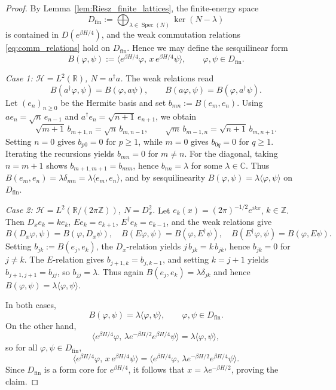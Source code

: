 \documentclass[11pt]{amsart}
\newcommand{\1}{\mathbbm{1}}
\theoremstyle{plain}
\theoremstyle{definition}
\theoremstyle{remark}
\numberwithin{equation}{section}
\begin{document}
\begin{proof}
By Lemma~\ref{lem:Riesz_finite_lattices}, the finite-energy space
\[
D_{\mathrm{fin}}:=\bigoplus_{\lambda\in\operatorname{Spec}(N)}\ker(N-\lambda)
\]
is contained in $D(e^{\beta H/4})$, and the weak commutation relations \eqref{eq:comm_relations} hold on $D_{\mathrm{fin}}$. Hence we may define the sesquilinear form
\[
B(\varphi,\psi):=\langle e^{\beta H/4}\varphi,\, x\,e^{\beta H/4}\psi\rangle,\qquad \varphi,\psi\in D_{\mathrm{fin}}.
\]

\textit{Case 1: $\mathcal H=L^2(\mathbb R)$, $N=a^\dagger a$.}
The weak relations read
\[
B(a^\dagger\varphi,\psi)=B(\varphi,a\psi),\qquad B(a\varphi,\psi)=B(\varphi,a^\dagger\psi).
\]
Let $(e_n)_{n\ge0}$ be the Hermite basis and set $b_{mn}:=B(e_m,e_n)$. Using $ae_n=\sqrt n\,e_{n-1}$ and $a^\dagger e_n=\sqrt{n+1}\,e_{n+1}$, we obtain
\[
\sqrt{m+1}\,b_{m+1,n}=\sqrt n\,b_{m,n-1},\qquad \sqrt m\,b_{m-1,n}=\sqrt{n+1}\,b_{m,n+1}.
\]
Setting $n=0$ gives $b_{p0}=0$ for $p\ge1$, while $m=0$ gives $b_{0q}=0$ for $q\ge1$. Iterating the recursions yields $b_{mn}=0$ for $m\neq n$. For the diagonal, taking $n=m+1$ shows $b_{m+1,m+1}=b_{mm}$, hence $b_{nn}=\lambda$ for some $\lambda\in\mathbb C$. Thus $B(e_m,e_n)=\lambda\delta_{mn}=\lambda\langle e_m,e_n\rangle$, and by sesquilinearity $B(\varphi,\psi)=\lambda\langle\varphi,\psi\rangle$ on $D_{\mathrm{fin}}$.

\textit{Case 2: $\mathcal H=L^2(\mathbb R/(2\pi\mathbb Z))$, $N=D_x^2$.}
Let $e_k(x)=(2\pi)^{-1/2}e^{ikx}$, $k\in\mathbb Z$. Then $D_x e_k=ke_k$, $Ee_k=e_{k+1}$, $E^\dagger e_k=e_{k-1}$, and the weak relations give
\[
B(D_x\varphi,\psi)=B(\varphi,D_x\psi),\quad B(E\varphi,\psi)=B(\varphi,E^\dagger\psi),\quad B(E^\dagger\varphi,\psi)=B(\varphi,E\psi).
\]
Setting $b_{jk}:=B(e_j,e_k)$, the $D_x$-relation yields $j\,b_{jk}=k\,b_{jk}$, hence $b_{jk}=0$ for $j\neq k$. The $E$-relation gives $b_{j+1,k}=b_{j,k-1}$, and setting $k=j+1$ yields $b_{j+1,j+1}=b_{jj}$, so $b_{jj}=\lambda$. Thus again $B(e_j,e_k)=\lambda\delta_{jk}$ and hence $B(\varphi,\psi)=\lambda\langle\varphi,\psi\rangle$.

In both cases,
\[
B(\varphi,\psi)=\lambda\langle\varphi,\psi\rangle,\qquad \varphi,\psi\in D_{\mathrm{fin}}.
\]
On the other hand,
\[
\langle e^{\beta H/4}\varphi,\, \lambda e^{-\beta H/2}e^{\beta H/4}\psi\rangle=\lambda\langle\varphi,\psi\rangle,
\]
so for all $\varphi,\psi\in D_{\mathrm{fin}}$,
\[
\langle e^{\beta H/4}\varphi,\, x\,e^{\beta H/4}\psi\rangle=\langle e^{\beta H/4}\varphi,\, \lambda e^{-\beta H/2}e^{\beta H/4}\psi\rangle.
\]
Since $D_{\mathrm{fin}}$ is a form core for $e^{\beta H/4}$, it follows that $x=\lambda e^{-\beta H/2}$, proving the claim.
\end{proof}
\end{document}
